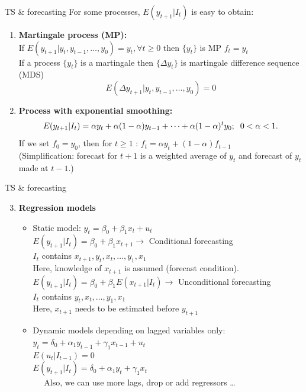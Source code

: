 \documentclass{beamer}
\begin{document}
\begin{frame}{TS \& forecasting}
For some processes, $E(y_{t+1}|I_t)$ is easy to obtain:
\begin{enumerate}
\item \textbf{Martingale process (MP):}\\
If $E(y_{t+1}|y_{t},y_{t-1},\dots,y_{0})=y_t, \forall t \geq 0$ then $\{y_t\}$ is MP $f_t=y_t$\\
If a process $\{y_t\}$ is a martingale then $\{\Delta y_t\}$ is martingale difference sequence (MDS) 
$$ E(\Delta y_{t+1}|y_{t},y_{t-1},\dots,y_{0})=0$$
\medskip
\item \textbf{Process with exponential smoothing:}
$$E(y_{t+1}|I_t)=\alpha y_t + \alpha (1- \alpha) y_{t-1}+ \dots + \alpha(1-\alpha)^ty_0; 
\hspace{0.2cm} 0 < \alpha < 1.$$
If we set $f_0=y_0$, then for $t\geq 1$ : $f_t = \alpha y_t + (1-\alpha)f_{t-1}$ \\ \medskip
\footnotesize (Simplification: forecast for $t+1$ is a weighted average of $y_t$ and forecast of $y_t$ made at $t-1$.)
\end{enumerate}
\end{frame}
\begin{frame}{TS \& forecasting}
\begin{enumerate}
\setcounter{enumi}{2}
\item \textbf{Regression models}
\begin{itemize}
\item Static model: $y_t=\beta_0 + \beta_1 x_t + u_t$\\
$E(y_{t+1}|I_t)=\beta_0 + \beta_1 x_{t+1} \rightarrow$ Conditional forecasting\\
$I_t$ contains $x_{t+1}, y_t, x_t,\dots, y_1, x_1$\\
Here, knowledge of $x_{t+1}$ is assumed (forecast condition).\\
\medskip
$E(y_{t+1}|I_t)=\beta_0 + \beta_1 E(x_{t+1}|I_t) \rightarrow$ Unconditional forecasting\\
$I_t$ contains $y_t, x_t,\dots, y_1, x_1$\\
Here, $x_{t+1}$ needs to be estimated before $y_{t+1}$\\
\vspace{0.5cm}
\item Dynamic models depending on lagged variables only:\\
$y_t=\delta_0+\alpha_1 y_{t-1} + \gamma_1 x_{t-1} + u_t$\\
$E(u_t|I_{t-1})=0$\\
$E(y_{t+1}|I_t)=\delta_0+\alpha_1 y_{t} + \gamma_1 x_{t}$\\
~~ Also, we can use more lags, drop or add regressors \dots 
\end{itemize}
\end{enumerate}
\end{frame}
\end{document}
